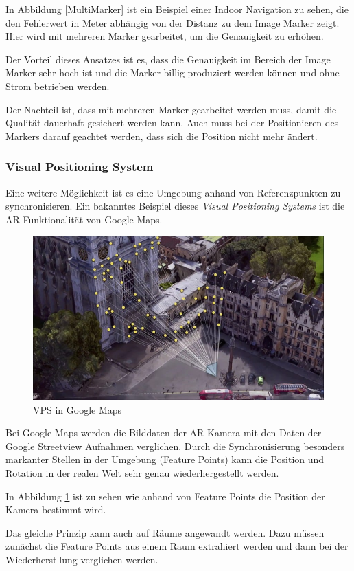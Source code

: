 \documentclass[titlepage, a4paper, 11pt]{scrartcl}
\begin{document}
  In Abbildung \ref{MultiMarker} ist ein Beispiel einer Indoor Navigation zu sehen, die den Fehlerwert in Meter abhängig von der Distanz zu dem Image Marker zeigt.
  Hier wird mit mehreren Marker gearbeitet, um die Genauigkeit zu erhöhen.

  Der Vorteil dieses Ansatzes ist es, dass die Genauigkeit im Bereich der Image Marker sehr hoch ist und die Marker billig produziert werden können und ohne Strom betrieben werden.

  Der Nachteil ist, dass mit mehreren Marker gearbeitet werden muss, damit die Qualität dauerhaft gesichert werden kann. Auch muss bei der Positionieren des Markers darauf geachtet werden, dass sich die Position nicht mehr ändert.

  \subsubsection{Visual Positioning System}

  Eine weitere Möglichkeit ist es eine Umgebung anhand von Referenzpunkten zu synchronisieren.
  Ein bakanntes Beispiel dieses \textit{Visual Positioning Systems} ist die AR Funktionalität von Google Maps.
  
  \begin{figure}[h]
    \centering
    \includegraphics[width=.5\textwidth]{vps-google}
    \caption{VPS in Google Maps \cite{GoogleMa12:online}}
    \label{VPSGoogle}
  \end{figure}

  Bei Google Maps werden die Bilddaten der AR Kamera mit den Daten der Google Streetview Aufnahmen verglichen.
  Durch die Synchronisierung besonders markanter Stellen in der Umgebung (Feature Points) kann die Position und Rotation in der realen Welt sehr genau wiederhergestellt werden.

  In Abbildung \ref{VPSGoogle} ist zu sehen wie anhand von Feature Points die Position der Kamera bestimmt wird.

  Das gleiche Prinzip kann auch auf Räume angewandt werden. Dazu müssen zunächst die Feature Points aus einem Raum extrahiert werden und dann bei der Wiederherstllung verglichen werden.
\end{document}
